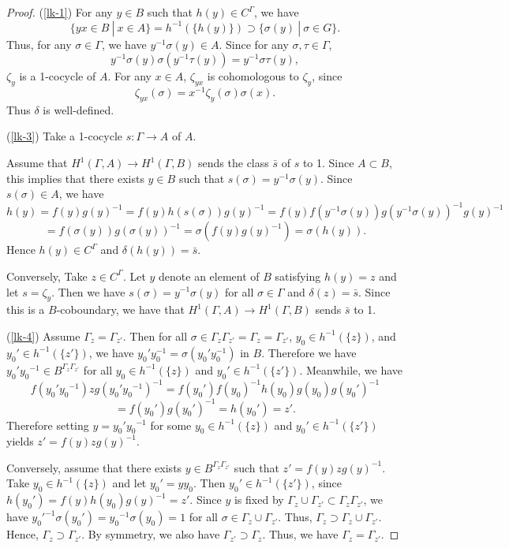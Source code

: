 \documentclass[10pt,a4paper]{amsart}
\numberwithin{equation}{section}
\theoremstyle{plain}
\theoremstyle{definition}
\begin{document}
\begin{proof}
(\ref{lk-1}) For any $y\in B$ such that $h(y)\in C^\Gamma$, we have
\begin{equation}
\{yx\in B\ |\ x\in A\}=h^{-1}(\{h(y)\})\supset \{\sigma(y)\ |\ \sigma\in G\}.
\end{equation}
Thus, for any $\sigma\in\Gamma$, we have $y^{-1}\sigma(y)\in A$. Since for any $\sigma,\tau\in\Gamma$,
\begin{equation}
y^{-1}\sigma(y)\sigma(y^{-1}\tau(y))=y^{-1}\sigma\tau(y),
\end{equation}
$\zeta_y$ is a 1-cocycle of $A$. For any $x\in A$, $\zeta_{yx}$ is cohomologous to $\zeta_y$, since
\begin{equation}
\zeta_{yx}(\sigma)=x^{-1}\zeta_y(\sigma)\sigma(x).
\end{equation}
Thus $\delta$ is well-defined.

(\ref{lk-3}) Take a 1-cocycle $s:\Gamma\to A$ of $A$.

Assume that $H^1(\Gamma,A)\to H^1(\Gamma,B)$ sends the class $\bar{s}$ of $s$ to 1. Since $A\subset B$, this implies that there exists $y\in B$ such that $s(\sigma)=y^{-1}\sigma(y)$. Since $s(\sigma)\in A$, we have
\[
h(y)=f(y)g(y)^{-1}=f(y)h(s(\sigma))g(y)^{-1}=f(y)f(y^{-1}\sigma(y))g(y^{-1}\sigma(y))^{-1}g(y)^{-1}
\]
\begin{equation}
=f(\sigma(y))g(\sigma(y))^{-1}=\sigma(f(y)g(y)^{-1})=\sigma(h(y)).
\end{equation} 
Hence $h(y)\in C^\Gamma$ and $\delta(h(y))=\bar{s}$.

Conversely, Take $z\in C^\Gamma$. Let $y$ denote an element of $B$ satisfying $h(y)=z$ and let $s=\zeta_y$. Then we have $s(\sigma)=y^{-1}\sigma(y)$ for all $\sigma\in\Gamma$ and $\delta(z)=\bar{s}$. Since this is a $B$-coboundary, we have that $H^1(\Gamma,A)\to H^1(\Gamma,B)$ sends $\bar{s}$ to 1.

(\ref{lk-4})
Assume $\Gamma_z=\Gamma_{z'}$. Then for all $\sigma\in\Gamma_z\Gamma_{z'}=\Gamma_z=\Gamma_{z'}$, $y_0\in h^{-1}(\{z\})$, and $y_0'\in h^{-1}(\{z'\})$, we have $y_0'y_0^{-1}=\sigma(y_0'y_0^{-1})$ in $B$. Therefore we have $y_0'{y_0}^{-1}\in B^{\Gamma_z\Gamma_{z'}}$ for all $y_0\in h^{-1}(\{z\})$ and $y_0'\in h^{-1}(\{z'\})$. Meanwhile, we have
\[
f(y_0'{y_0}^{-1})zg(y_0'{y_0}^{-1})^{-1}=f(y_0')f(y_0)^{-1}h(y_0)g(y_0)g(y_0')^{-1}
\]
\begin{equation}
=f(y_0')g(y_0')^{-1}=h(y_0')=z'.
\end{equation}
Therefore setting $y=y_0'{y_0}^{-1}$ for some $y_0\in h^{-1}(\{z\})$ and $y_0'\in h^{-1}(\{z'\})$ yields $z'=f(y)zg(y)^{-1}$. 

Conversely, assume that there exists $y\in B^{\Gamma_z\Gamma_{z'}}$ such that $z'=f(y)zg(y)^{-1}$. Take $y_0\in h^{-1}(\{z\})$ and let $y_0'=yy_0$. Then $y_0'\in h^{-1}(\{z'\})$, since $h(y_0')=f(y)h(y_0)g(y)^{-1}=z'$. Since $y$ is fixed by $\Gamma_z\cup\Gamma_{z'}\subset\Gamma_z\Gamma_{z'}$, we have ${y_0'}^{-1}\sigma(y_0')={y_0}^{-1}\sigma(y_0)=1$ for all $\sigma\in\Gamma_z\cup\Gamma_{z'}$. Thus, $\Gamma_z\supset\Gamma_z\cup\Gamma_{z'}$. Hence, $\Gamma_z\supset\Gamma_{z'}$. By symmetry, we also have $\Gamma_{z'}\supset\Gamma_z$. Thus, we have $\Gamma_z=\Gamma_{z'}$.
\end{proof}
\end{document}
